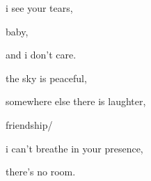 \documentclass[extrafontsizes, 48pt]{memoir}
\newcommand\blankpage{%
    \null
    \thispagestyle{empty}%
    \addtocounter{page}{-1}%
    \newpage}
\begin{document}
	\begin{minipage}{.6\textwidth}
	i see your tears,
	\end{minipage}
	\newpage

	\begin{minipage}{.6\textwidth}
	baby,
	\end{minipage}
	\newpage

	\begin{minipage}{.6\textwidth}
	and i don't care.
	\afterpage{\blankpage}
	\end{minipage}
	\newpage

	\begin{minipage}{.6\textwidth}
	the sky is peaceful,
	\end{minipage}
	\newpage

	\begin{minipage}{.6\textwidth}
	somewhere else there is laughter,
	\end{minipage}
	\newpage

	\begin{minipage}{.6\textwidth}
	friendship/
	\afterpage{\blankpage}
	\end{minipage}
	\newpage

	\begin{minipage}{.6\textwidth}
	i can't breathe in your presence, 
	\end{minipage}
	\newpage

	\begin{minipage}{.6\textwidth}
	there's no room.
	\end{minipage}
	\newpage
\end{document}
